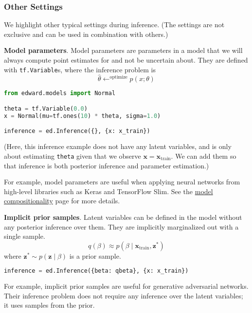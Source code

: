 \subsubsection{Other Settings}

We highlight other typical settings during inference. (The settings
are not exclusive and can be used in combination with others.)

\textbf{Model parameters}.
Model parameters are parameters in a model that we will always compute
point estimates for and not be uncertain about.
They are defined with \texttt{tf.Variable}s, where the inference
problem is
\begin{equation*}
\hat{\theta} \leftarrow^{\text{optimize}}
p(x; \theta)
\end{equation*}

\begin{lstlisting}[language=Python]
from edward.models import Normal

theta = tf.Variable(0.0)
x = Normal(mu=tf.ones(10) * theta, sigma=1.0)

inference = ed.Inference({}, {x: x_train})
\end{lstlisting}
(Here, this inference example does not have any latent variables, and
is only about estimating \texttt{theta} given that we observe
$\mathbf{x} = \mathbf{x}_{\text{train}}$. We can add them so that
inference is both posterior inference and parameter estimation.)

For example, model parameters are useful when applying neural networks
from high-level libraries such as Keras and TensorFlow Slim. See
the \href{/api/model-compositionality}{model compositionality} page
for more details.

\textbf{Implicit prior samples}.
Latent variables can be defined in the model without any posterior
inference over them.
They are implicitly marginalized out with a single sample.
\begin{equation*}
q(\beta)\approx
p(\beta\mid\mathbf{x}_{\text{train}}, \mathbf{z}^*)
\end{equation*}
where $\mathbf{z}^*\sim p(\mathbf{z}\mid\beta)$ is a prior sample.

\begin{lstlisting}[language=Python]
inference = ed.Inference({beta: qbeta}, {x: x_train})
\end{lstlisting}

For example, implicit prior samples are useful for generative adversarial
networks. Their inference problem does not require any inference over
the latent variables; it uses samples from the prior.

